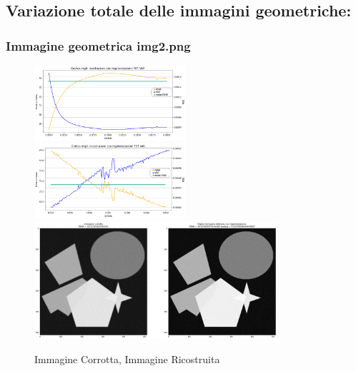 {\color{rred}\subsection{Variazione totale delle immagini geometriche:}}
{\color{rred}\subsubsection{Immagine geometrica img2.png}}
\begin{figure}[H]{}
    \centering
    \includegraphics[width=0.5\textwidth]{IMMAGINI_RELAZIONE/grafico2TOTVAR_riserva.png}%
    \includegraphics[width=0.5\textwidth]{IMMAGINI_RELAZIONE/proseguimentoGraficoTOTVAR2.png}
    \includegraphics[width=0.8\textwidth]{IMMAGINI_RELAZIONE/ricostruzione2TOTVAR.png}
    \caption{Immagine Corrotta, Immagine Ricostruita}
\end{figure}


